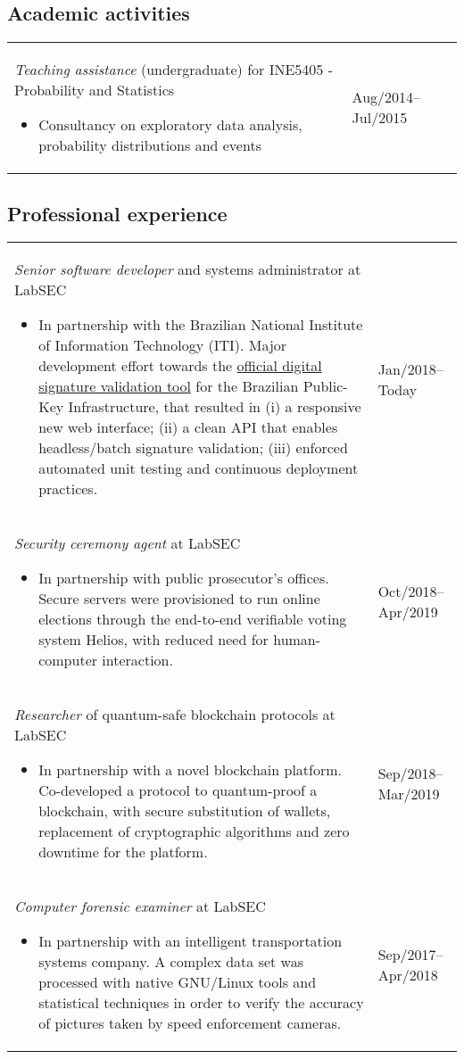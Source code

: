 \documentclass[12pt]{article}
\makeatletter
\newenvironment{datetable}
  {\newcolumntype{R}{>{\raggedleft\arraybackslash}p{0.14\textwidth}}
   \newcolumntype{L}{p{0.84\textwidth}}
   \begin{tabular}{@{\hspace{0mm}}LR}}
  {\end{tabular}}
\newenvironment{contenttable}[1]
  {\subsection*{#1}
   \begin{datetable}}
  {\end{datetable}}
\makeatother
\begin{document}
\begin{contenttable}{Academic activities}
  \textit{Teaching assistance} (undergraduate) for INE5405 - Probability and
    Statistics
  \begin{itemize}
    \item Consultancy on exploratory data analysis, probability distributions
        and events
  \end{itemize} & Aug/2014--Jul/2015 \\
\end{contenttable}

\begin{contenttable}{Professional experience}
  \textit{Senior software developer} and systems administrator at LabSEC
  \begin{itemize}
    \item In partnership with the Brazilian National Institute of Information
        Technology (ITI). Major development effort towards the
          \href{https://verificador.iti.gov.br}{official digital signature
          validation tool} for the Brazilian Public-Key Infrastructure, that
          resulted in (i) a responsive new web interface; (ii) a clean API that
          enables headless/batch signature validation; (iii) enforced automated
          unit testing and continuous deployment practices.
  \end{itemize} & Jan/2018--Today \\

  \textit{Security ceremony agent} at LabSEC
  \begin{itemize}
    \item In partnership with public prosecutor's offices. Secure servers were
        provisioned to run online elections through the end-to-end verifiable
          voting system Helios, with reduced need for human-computer
          interaction.
  \end{itemize} & Oct/2018--Apr/2019 \\

  \textit{Researcher} of quantum-safe blockchain protocols at LabSEC
  \begin{itemize}
    \item In partnership with a novel blockchain platform. Co-developed a
        protocol to quantum-proof a blockchain, with secure substitution of
          wallets, replacement of cryptographic algorithms and zero downtime
          for the platform.
  \end{itemize} & Sep/2018--Mar/2019 \\

  \textit{Computer forensic examiner} at LabSEC
  \begin{itemize}
    \item In partnership with an intelligent transportation systems company. A
        complex data set was processed with native GNU/Linux tools and
          statistical techniques in order to verify the accuracy of pictures
          taken by speed enforcement cameras.
  \end{itemize} & Sep/2017--Apr/2018 \\


\end{contenttable}
\end{document}
